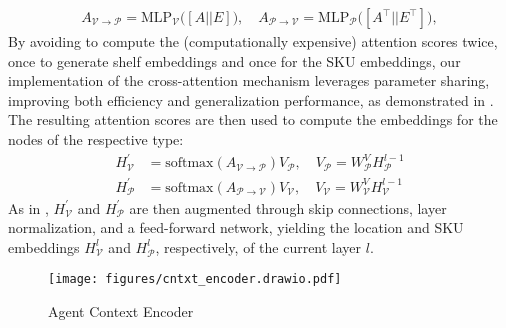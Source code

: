 %
\begin{align}
    \label{eq:matnet_mixed_score}
     A_{\mathcal{V} \rightarrow \mathcal{P}} = \mathrm{MLP}_{\mathcal{V}} \big ([A || E ] \big ), \quad  A_{\mathcal{P} \rightarrow \mathcal{V}} = \mathrm{MLP}_{\mathcal{P}} \big ([A^\top || E^\top ] \big ),
\end{align}
%
By avoiding to compute the (computationally expensive) attention scores twice, once to generate shelf embeddings and once for the SKU embeddings, our implementation of the cross-attention mechanism leverages parameter sharing, improving both efficiency and generalization performance, as demonstrated in . 
The resulting attention scores are then used to compute the embeddings for the nodes of the respective type: 
%
\begin{align}
     H_{\mathcal{V}}^\prime &= \text{softmax}(A_{\mathcal{V} \rightarrow \mathcal{P}})V_\mathcal{P}, \quad V_\mathcal{P} = W^{V}_\mathcal{P} H_{\mathcal{P}}^{l-1} \\
     H_{\mathcal{P}}^\prime &= \text{softmax}(A_{\mathcal{P} \rightarrow \mathcal{V}})V_\mathcal{V}, \quad V_\mathcal{V} = W^{V}_\mathcal{V} H_{\mathcal{V}}^{l-1}
\end{align}
%
As in \cite{vaswaniAttentionAllYou2017a}, $H_{\mathcal{V}}^\prime$ and $H_{\mathcal{P}}^\prime$  are then augmented through skip connections, layer normalization, and a feed-forward network, yielding the location and SKU embeddings $H_{\mathcal{V}}^l$ and $H_{\mathcal{P}}^l$, respectively, of the current layer $l$. 
%



\setlength{\intextsep}{10pt}%
\begin{wrapfigure}{r}{0.6\textwidth}
  \begin{center}
    \vspace{-20pt}
    \texttt{[image: figures/cntxt\_encoder.drawio.pdf]}
    \vspace{-35pt}
  \end{center}
  \caption{Agent Context Encoder}
  \label{fig:cntxt}
\end{wrapfigure}

